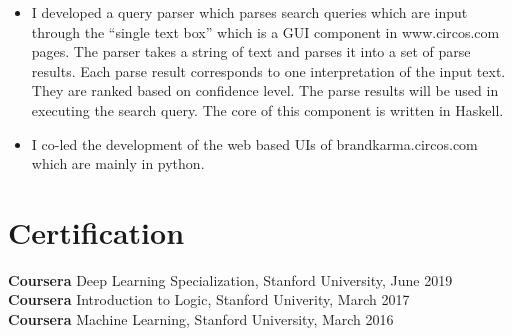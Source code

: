 \documentclass[margin,line]{res}
\newcommand{\longversion}[1]{}
\newcommand{\ignore}[1]{}
\begin{document}
\begin{resume}
{\begin{itemize}
   in different languages (e.g. English and Chinese). 
   Brand information is often incomplete and described differently in different sources. The system
   identifies similarities among the brands based on the context and (partially complete) attributes. 
   The system is scalable and capable to process gigabytes of unreliable data. 
   The system equipped with its own scheduler, with Haskell STM, it is able to handle concurrent jobs. 
 \item I developed a query parser which parses search queries which are input through
   the ``single text box'' which is a GUI component in www.circos.com pages. The 
   parser takes a string of text and parses it into a set of parse
   results. Each parse result corresponds to one interpretation of the
   input text. They are ranked based on confidence level. The parse
   results will be used in executing the search query. The core of this component is written 
  in Haskell.
 \item I co-led the development of the web based UIs of brandkarma.circos.com which are mainly in python.
\end{itemize}
}

\section{\sc Certification}
{\bf Coursera} Deep Learning Specialization, Stanford University, June
2019 \\
{\bf Coursera} Introduction to Logic, Stanford Univerity, March 2017 \\
{\bf Coursera} Machine Learning, Stanford University, March 2016 \\




\longversion{

\ignore{
\section{\sc Part time and Internship}
{\bf Keppel Shipyard Pte Ltd.} Singapore
\\
{\em Attachment programmer} \hfill {\bf May 1999 - Nov 1999}\\
Developer of Oracle based in-house project. In charge of front-end window-based "Subcontractor Returning System" and part of back-end database design.

{\bf CharterTelecom Pte Ltd.} Hong Kong
\\
{\em Part time Technical Engineer} \hfill {\bf Jan 2002 - Apr 2004} \\
In charge of installation, maintenance, configuration of data server, IVR and voice gateway 
(varies models from Unified, Cisco and etc.)
}

}
\end{resume}
\end{document}
